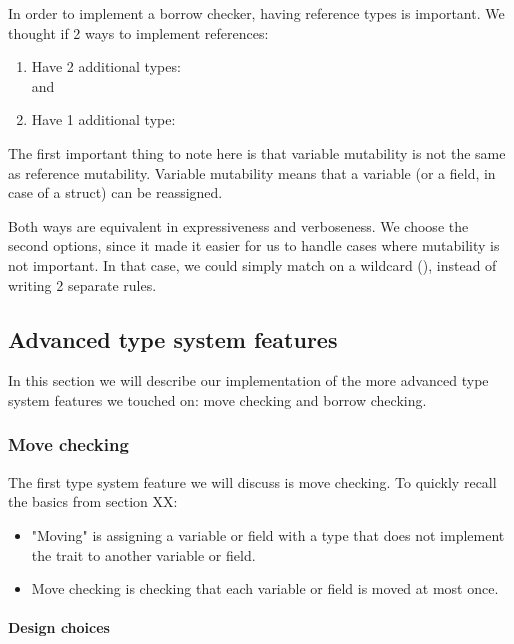 In order to implement a borrow checker, having reference types is important. We thought if 2 ways to implement references:
\begin{enumerate}
    \item Have 2 additional types: \\ 
     and\\ 
    \item Have 1 additional type:
    \\ 
\end{enumerate}

The first important thing to note here is that variable mutability is not the same as reference mutability. Variable mutability means that a variable (or a field, in case of a struct) can be reassigned.

Both ways are equivalent in expressiveness and verboseness. We choose the second options, since it made it easier for us to handle cases where mutability is not important. In that case, we could simply match on a wildcard (\code{_}), instead of writing 2 separate rules.

\subsection{Advanced type system features}

In this section we will describe our implementation of the more advanced type system features we touched on: move checking and borrow checking.

\subsubsection{Move checking}

The first type system feature we will discuss is move checking. To quickly recall the basics from section XX:
\begin{itemize}
    \item "Moving" is assigning a variable or field with a type that does not implement the  trait to another variable or field.
    \item Move checking is checking that each variable or field is moved at most once.
\end{itemize}

\paragraph{Design choices}

